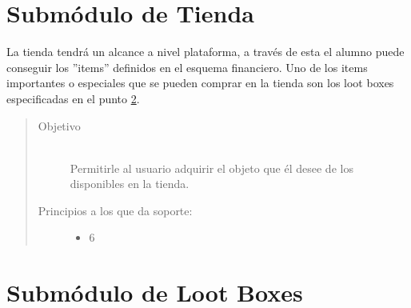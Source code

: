 \section{Submódulo de Tienda}

    La tienda tendrá un alcance a nivel plataforma, a través de esta el alumno puede conseguir los ''items'' definidos en el esquema financiero. Uno de los items importantes o especiales que se pueden comprar en la tienda son los loot boxes especificadas en el punto \ref{herr:lootBoxes}.
    
    \begin{quote}
    \begin{description}
    \item[Objetivo] \hfill\\
        Permitirle al usuario adquirir el objeto que él desee de los disponibles en la tienda.
    
    \item[Principios a los que da soporte:] \hfill
        \begin{itemize}
            \item 6 \principioVI
        \end{itemize}
    \end{description}
    \end{quote}

\section{Submódulo de Loot Boxes}
\label{herr:lootBoxes}

\begin{comment}
    Cada Loot Box desbloquea 4 objetos de la siguiente lista para el usuario:
    \begin{itemize}
        \item Apodo - Objeto de personalización
        \item Tema (Color) - Objeto de personalización
        \item Tema (Patron) - Objeto de personalización
        \item Imagen de perfil - Objeto de personalización
        \item Loot Box
        \item Cierta cantidad de monedas de oro y/o plata
    \end{itemize}
\end{comment}

